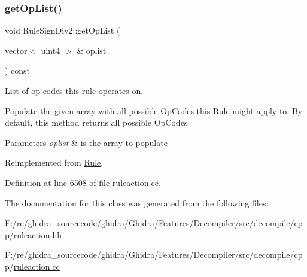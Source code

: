 \subsubsection{\texorpdfstring{getOpList()}{getOpList()}}
{\footnotesize\ttfamily void Rule\+Sign\+Div2\+::get\+Op\+List (\begin{DoxyParamCaption}\item[{vector$<$ uint4 $>$ \&}]{oplist }\end{DoxyParamCaption}) const\hspace{0.3cm}{\ttfamily [virtual]}}



List of op codes this rule operates on. 

Populate the given array with all possible Op\+Codes this \mbox{\hyperlink{class_rule}{Rule}} might apply to. By default, this method returns all possible Op\+Codes 
\begin{DoxyParams}{Parameters}
{\em oplist} & is the array to populate \\
\hline
\end{DoxyParams}


Reimplemented from \mbox{\hyperlink{class_rule_a4023bfc7825de0ab866790551856d10e}{Rule}}.



Definition at line 6508 of file ruleaction.\+cc.



The documentation for this class was generated from the following files\+:\begin{DoxyCompactItemize}
\item 
F\+:/re/ghidra\+\_\+sourcecode/ghidra/\+Ghidra/\+Features/\+Decompiler/src/decompile/cpp/\mbox{\hyperlink{ruleaction_8hh}{ruleaction.\+hh}}\item 
F\+:/re/ghidra\+\_\+sourcecode/ghidra/\+Ghidra/\+Features/\+Decompiler/src/decompile/cpp/\mbox{\hyperlink{ruleaction_8cc}{ruleaction.\+cc}}\end{DoxyCompactItemize}
